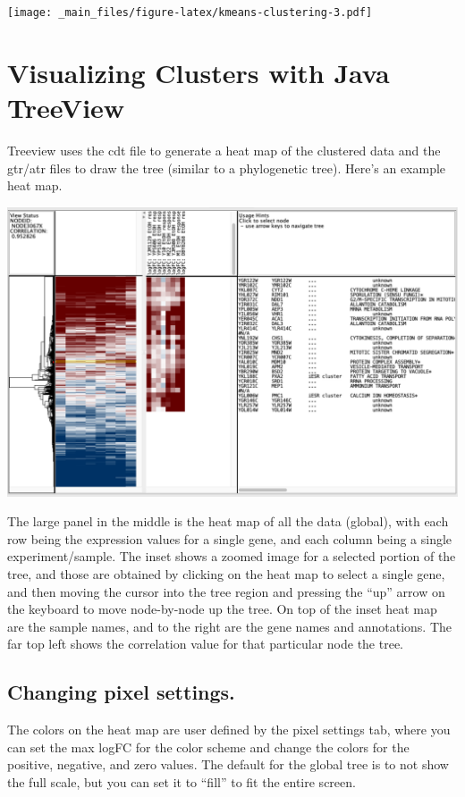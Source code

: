 \documentclass[
]{book}
\begin{document}
\texttt{[image: \_main\_files/figure-latex/kmeans-clustering-3.pdf]}

\hypertarget{visualizing-clusters-with-java-treeview}{%
\section{Visualizing Clusters with Java TreeView}\label{visualizing-clusters-with-java-treeview}}

Treeview uses the cdt file to generate a heat map of the clustered data and the gtr/atr files to draw the tree (similar to a phylogenetic tree). Here's an example heat map.

\includegraphics[width=31.28in]{figures/TreeView_Heatmap}

The large panel in the middle is the heat map of all the data (global), with each row being the expression values for a single gene, and each column being a single experiment/sample. The inset shows a zoomed image for a selected portion of the tree, and those are obtained by clicking on the heat map to select a single gene, and then moving the cursor into the tree region and pressing the ``up'' arrow on the keyboard to move node-by-node up the tree. On top of the inset heat map are the sample names, and to the right are the gene names and annotations. The far top left shows the correlation value for that particular node the tree.

\hypertarget{changing-pixel-settings.}{%
\subsection{Changing pixel settings.}\label{changing-pixel-settings.}}

The colors on the heat map are user defined by the pixel settings tab, where you can set the max logFC for the color scheme and change the colors for the positive, negative, and zero values. The default for the global tree is to not show the full scale, but you can set it to ``fill'' to fit the entire screen.
\end{document}
